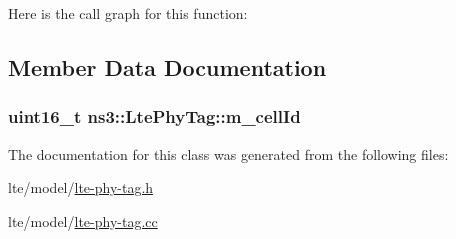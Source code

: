 Here is the call graph for this function\+:




\subsection{Member Data Documentation}
\subsubsection[{\texorpdfstring{m\+\_\+cell\+Id}{m_cellId}}]{\setlength{\rightskip}{0pt plus 5cm}uint16\+\_\+t ns3\+::\+Lte\+Phy\+Tag\+::m\+\_\+cell\+Id\hspace{0.3cm}{\ttfamily [private]}}\hypertarget{classns3_1_1LtePhyTag_a59bd16577c1465959a74bd359adce140}{}\label{classns3_1_1LtePhyTag_a59bd16577c1465959a74bd359adce140}


The documentation for this class was generated from the following files\+:\begin{DoxyCompactItemize}
\item 
lte/model/\hyperlink{lte-phy-tag_8h}{lte-\/phy-\/tag.\+h}\item 
lte/model/\hyperlink{lte-phy-tag_8cc}{lte-\/phy-\/tag.\+cc}\end{DoxyCompactItemize}
